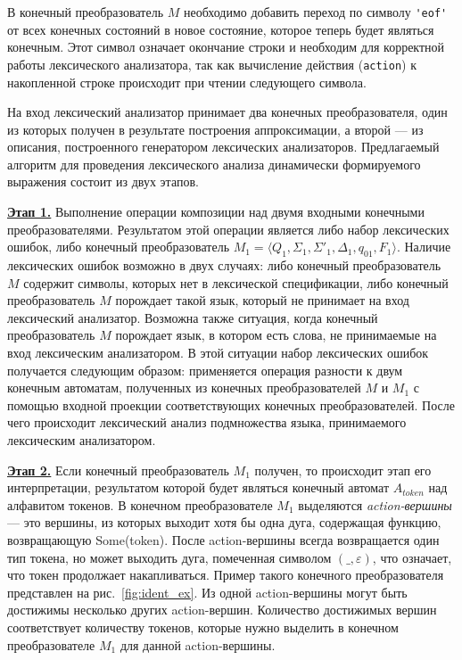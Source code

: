 \documentclass[10pt, conference, compsocconf]{IEEEtran}
\begin{document}
В конечный преобразователь $M$ необходимо добавить переход по символу \verb|'eof'| от всех конечных состояний в новое состояние, которое теперь будет являться конечным. Этот символ означает окончание строки и необходим для корректной работы лексического анализатора, так как вычисление действия (\verb|action|) к накопленной строке происходит при чтении следующего символа.  

На вход лексический анализатор принимает два конечных преобразователя, один из которых получен в результате построения аппроксимации, а второй --- из описания, построенного генератором лексических анализаторов. Предлагаемый алгоритм для проведения лексического анализа динамически формируемого выражения состоит из двух этапов.

\textbf{\underline{Этап 1.}}  Выполнение операции композиции над двумя входными конечными преобразователями. Результатом этой операции является либо набор лексических ошибок, либо конечный преобразователь $M_1 = \langle Q_1, \Sigma_1, \Sigma'_1, \Delta_1, q_{01}, F_1 \rangle$. Наличие лексических ошибок возможно в двух случаях: либо конечный преобразователь $M$  содержит символы, которых нет в лексической спецификации, либо конечный преобразователь $M$ порождает такой язык, который не принимает на вход лексический анализатор. Возможна также ситуация, когда конечный преобразователь $M$ порождает язык, в котором есть слова, не принимаемые на вход лексическим анализатором. В этой ситуации  набор лексических ошибок получается следующим образом: применяется операция разности к двум конечным автоматам, полученных из конечных преобразователей $M$ и $M_1$ с помощью входной  проекции соответствующих конечных преобразователей. После чего происходит лексический анализ подмножества языка, принимаемого лексическим анализатором. 


\textbf{\underline{Этап 2.}} Если конечный преобразователь $M_1$ получен, то происходит этап его интерпретации, результатом которой будет являться конечный автомат $A_{token}$ над алфавитом токенов.  В конечном преобразователе $M_1$ выделяются \textit{action-вершины} --- это вершины, из которых выходит хотя бы одна дуга, содержащая функцию, возвращающую Some(token). После action-вершины всегда возвращается один тип токена, но может выходить дуга, помеченная символом $(\_,\varepsilon )$, что означает, что токен продолжает накапливаться. Пример такого конечного преобразователя представлен на рис.~\ref{fig:ident_ex}. Из одной action-вершины могут быть достижимы несколько других action-вершин. Количество достижимых вершин соответствует количеству токенов, которые нужно выделить в конечном преобразователе $M_1$ для данной action-вершины.  
% 
% 
\end{document}
